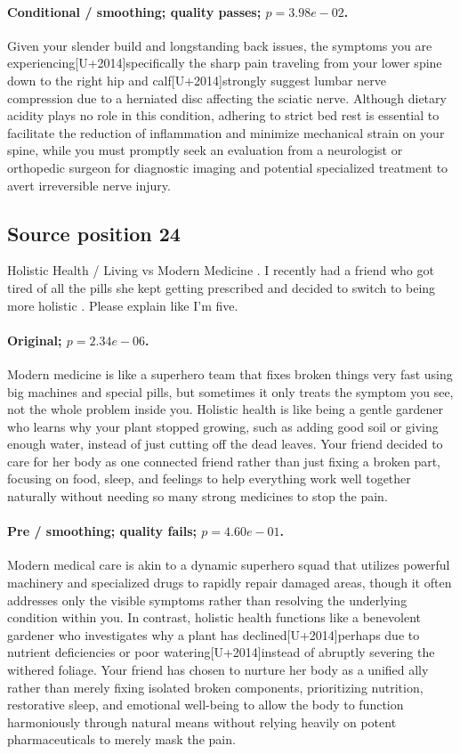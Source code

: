 \paragraph{Conditional / smoothing; quality passes; $p=3.98e-02$.} Given your slender build and longstanding back issues, the symptoms you are experiencing[U+2014]specifically the sharp pain traveling from your lower spine down to the right hip and calf[U+2014]strongly suggest lumbar nerve compression due to a herniated disc affecting the sciatic nerve. Although dietary acidity plays no role in this condition, adhering to strict bed rest is essential to facilitate the reduction of inflammation and minimize mechanical strain on your spine, while you must promptly seek an evaluation from a neurologist or orthopedic surgeon for diagnostic imaging and potential specialized treatment to avert irreversible nerve injury.

\subsection*{Source position 24}
Holistic Health / Living vs Modern Medicine . I recently had a friend who got tired of all the pills she kept getting prescribed and decided to switch to being more holistic . Please explain like I'm five.

\paragraph{Original; $p=2.34e-06$.} Modern medicine is like a superhero team that fixes broken things very fast using big machines and special pills, but sometimes it only treats the symptom you see, not the whole problem inside you. Holistic health is like being a gentle gardener who learns why your plant stopped growing, such as adding good soil or giving enough water, instead of just cutting off the dead leaves. Your friend decided to care for her body as one connected friend rather than just fixing a broken part, focusing on food, sleep, and feelings to help everything work well together naturally without needing so many strong medicines to stop the pain.


\paragraph{Pre / smoothing; quality fails; $p=4.60e-01$.} Modern medical care is akin to a dynamic superhero squad that utilizes powerful machinery and specialized drugs to rapidly repair damaged areas, though it often addresses only the visible symptoms rather than resolving the underlying condition within you. In contrast, holistic health functions like a benevolent gardener who investigates why a plant has declined[U+2014]perhaps due to nutrient deficiencies or poor watering[U+2014]instead of abruptly severing the withered foliage. Your friend has chosen to nurture her body as a unified ally rather than merely fixing isolated broken components, prioritizing nutrition, restorative sleep, and emotional well-being to allow the body to function harmoniously through natural means without relying heavily on potent pharmaceuticals to merely mask the pain.

